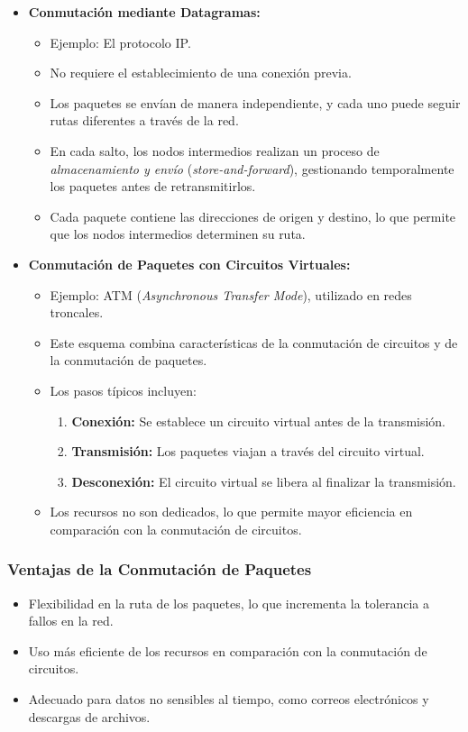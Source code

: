 \documentclass[a4paper,12pt]{article}
\begin{document}
\begin{itemize}
    \item \textbf{Conmutación mediante Datagramas:}
    \begin{itemize}
        \item Ejemplo: El protocolo IP.
        \item No requiere el establecimiento de una conexión previa.
        \item Los paquetes se envían de manera independiente, y cada uno puede seguir rutas diferentes a través de la red.
        \item En cada salto, los nodos intermedios realizan un proceso de \textit{almacenamiento y envío} (\textit{store-and-forward}), gestionando temporalmente los paquetes antes de retransmitirlos.
        \item Cada paquete contiene las direcciones de origen y destino, lo que permite que los nodos intermedios determinen su ruta.
    \end{itemize}
    
    \item \textbf{Conmutación de Paquetes con Circuitos Virtuales:}
    \begin{itemize}
        \item Ejemplo: ATM (\textit{Asynchronous Transfer Mode}), utilizado en redes troncales.
        \item Este esquema combina características de la conmutación de circuitos y de la conmutación de paquetes.
        \item Los pasos típicos incluyen:
        \begin{enumerate}
            \item \textbf{Conexión:} Se establece un circuito virtual antes de la transmisión.
            \item \textbf{Transmisión:} Los paquetes viajan a través del circuito virtual.
            \item \textbf{Desconexión:} El circuito virtual se libera al finalizar la transmisión.
        \end{enumerate}
        \item Los recursos no son dedicados, lo que permite mayor eficiencia en comparación con la conmutación de circuitos.
    \end{itemize}
\end{itemize}

\subsubsection*{Ventajas de la Conmutación de Paquetes}
\begin{itemize}
    \item Flexibilidad en la ruta de los paquetes, lo que incrementa la tolerancia a fallos en la red.
    \item Uso más eficiente de los recursos en comparación con la conmutación de circuitos.
    \item Adecuado para datos no sensibles al tiempo, como correos electrónicos y descargas de archivos.
\end{itemize}
\end{document}
